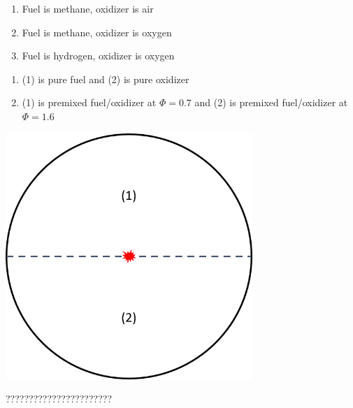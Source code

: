 \documentclass[11pt]{article}
\begin{document}
\begin{itemize}
\begin{minipage}{0.48\textwidth}
\begin{enumerate}
	\item Fuel is methane, oxidizer is air
	\item Fuel is methane, oxidizer is oxygen
	\item Fuel is hydrogen, oxidizer is oxygen
	\end{enumerate}
	
	\begin{enumerate}[label=\alph*.]
	\item (1) is pure fuel and (2) is pure oxidizer
	\item (1) is premixed fuel/oxidizer at $\Phi=0.7$ and (2) is premixed fuel/oxidizer at $\Phi=1.6$
	\end{enumerate}
\end{minipage}
\begin{minipage}{0.48\textwidth}
	\centering
	\includegraphics[width=0.7\textwidth]{Graphics/fuel_ox_sphere.PNG}
\end{minipage}

???????????????????????


\end{itemize}
\end{document}
